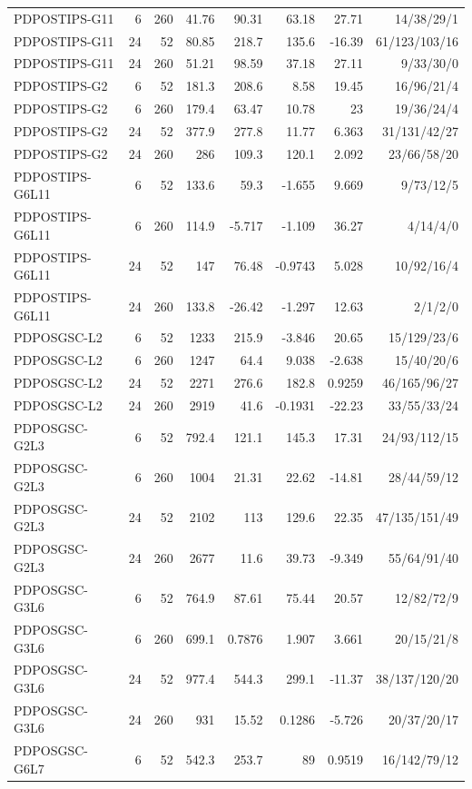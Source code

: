 \documentclass[10pt,a4paper]{article}
\begin{document}
\begin{center}
\begin{minipage}{\linewidth}
\begin{tabular}{lrrrrrrr}
PDPOSTIPS-G11 & 6 & 260 & 41.76 & 90.31 & 63.18 & 27.71 & 14/38/29/1 \\
PDPOSTIPS-G11 & 24 & 52 & 80.85 & 218.7 & 135.6 & -16.39 & 61/123/103/16 \\
PDPOSTIPS-G11 & 24 & 260 & 51.21 & 98.59 & 37.18 & 27.11 & 9/33/30/0 \\
PDPOSTIPS-G2 & 6 & 52 & 181.3 & 208.6 & 8.58 & 19.45 & 16/96/21/4 \\
PDPOSTIPS-G2 & 6 & 260 & 179.4 & 63.47 & 10.78 & 23 & 19/36/24/4 \\
PDPOSTIPS-G2 & 24 & 52 & 377.9 & 277.8 & 11.77 & 6.363 & 31/131/42/27 \\
PDPOSTIPS-G2 & 24 & 260 & 286 & 109.3 & 120.1 & 2.092 & 23/66/58/20 \\
PDPOSTIPS-G6L11 & 6 & 52 & 133.6 & 59.3 & -1.655 & 9.669 & 9/73/12/5 \\
PDPOSTIPS-G6L11 & 6 & 260 & 114.9 & -5.717 & -1.109 & 36.27 & 4/14/4/0 \\
PDPOSTIPS-G6L11 & 24 & 52 & 147 & 76.48 & -0.9743 & 5.028 & 10/92/16/4 \\
PDPOSTIPS-G6L11 & 24 & 260 & 133.8 & -26.42 & -1.297 & 12.63 & 2/1/2/0 \\
PDPOSGSC-L2 & 6 & 52 & 1233 & 215.9 & -3.846 & 20.65 & 15/129/23/6 \\
PDPOSGSC-L2 & 6 & 260 & 1247 & 64.4 & 9.038 & -2.638 & 15/40/20/6 \\
PDPOSGSC-L2 & 24 & 52 & 2271 & 276.6 & 182.8 & 0.9259 & 46/165/96/27 \\
PDPOSGSC-L2 & 24 & 260 & 2919 & 41.6 & -0.1931 & -22.23 & 33/55/33/24 \\
PDPOSGSC-G2L3 & 6 & 52 & 792.4 & 121.1 & 145.3 & 17.31 & 24/93/112/15 \\
PDPOSGSC-G2L3 & 6 & 260 & 1004 & 21.31 & 22.62 & -14.81 & 28/44/59/12 \\
PDPOSGSC-G2L3 & 24 & 52 & 2102 & 113 & 129.6 & 22.35 & 47/135/151/49 \\
PDPOSGSC-G2L3 & 24 & 260 & 2677 & 11.6 & 39.73 & -9.349 & 55/64/91/40 \\
PDPOSGSC-G3L6 & 6 & 52 & 764.9 & 87.61 & 75.44 & 20.57 & 12/82/72/9 \\
PDPOSGSC-G3L6 & 6 & 260 & 699.1 & 0.7876 & 1.907 & 3.661 & 20/15/21/8 \\
PDPOSGSC-G3L6 & 24 & 52 & 977.4 & 544.3 & 299.1 & -11.37 & 38/137/120/20 \\
PDPOSGSC-G3L6 & 24 & 260 & 931 & 15.52 & 0.1286 & -5.726 & 20/37/20/17 \\
PDPOSGSC-G6L7 & 6 & 52 & 542.3 & 253.7 & 89 & 0.9519 & 16/142/79/12 \\

\end{tabular}
\end{minipage}
\end{center}
\end{document}
